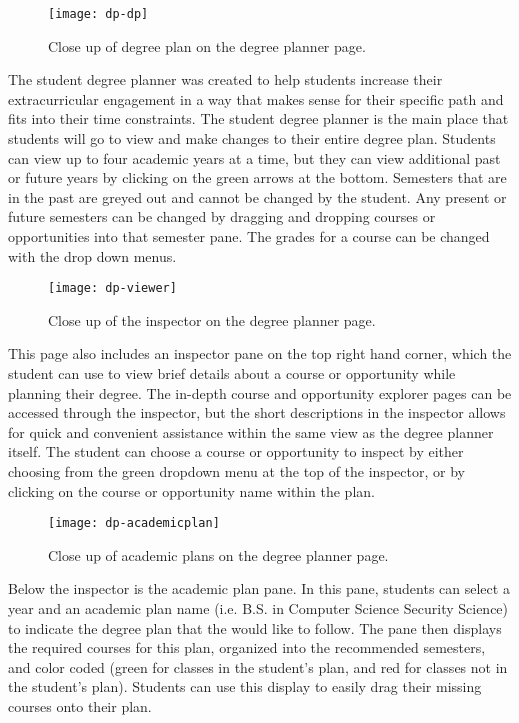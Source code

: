 \begin{figure}[htbp!]
\centering
\texttt{[image: dp-dp]}
\caption{Close up of degree plan on the degree planner page.}
\end{figure}
The student degree planner was created to help students increase their extracurricular engagement in a way that makes sense for their specific path and fits into their time constraints. The student degree planner is the main place that students will go to view and make changes to their entire degree plan. Students can view up to four academic years at a time, but they can view additional past or future years by clicking on the green arrows at the bottom. Semesters that are in the past are greyed out and cannot be changed by the student. Any present or future semesters can be changed by dragging and dropping courses or opportunities into that semester pane. The grades for a course can be changed with the drop down menus. 

\begin{figure}[htbp!]
\centering
\texttt{[image: dp-viewer]}
\caption{Close up of the inspector on the degree planner page.}
\end{figure}

This page also includes an inspector pane on the top right hand corner, which the student can use to view brief details about a course or opportunity while planning their degree. The in-depth course and opportunity explorer pages can be accessed through the inspector, but the short descriptions in the inspector allows for quick and convenient assistance within the same view as the degree planner itself. The student can choose a course or opportunity to inspect by either choosing from the green dropdown menu at the top of the inspector, or by clicking on the course or opportunity name within the plan. 

\begin{figure}[htbp!]
\centering
\texttt{[image: dp-academicplan]}
\caption{Close up of academic plans on the degree planner page.}
\end{figure}
Below the inspector is the academic plan pane. In this pane, students can select a year and an academic plan name (i.e. B.S. in Computer Science Security Science) to indicate the degree plan that the would like to follow. The pane then displays the required courses for this plan, organized into the recommended semesters, and color coded (green for classes in the student's plan, and red for classes not in the student's plan). Students can use this display to easily drag their missing courses onto their plan.


